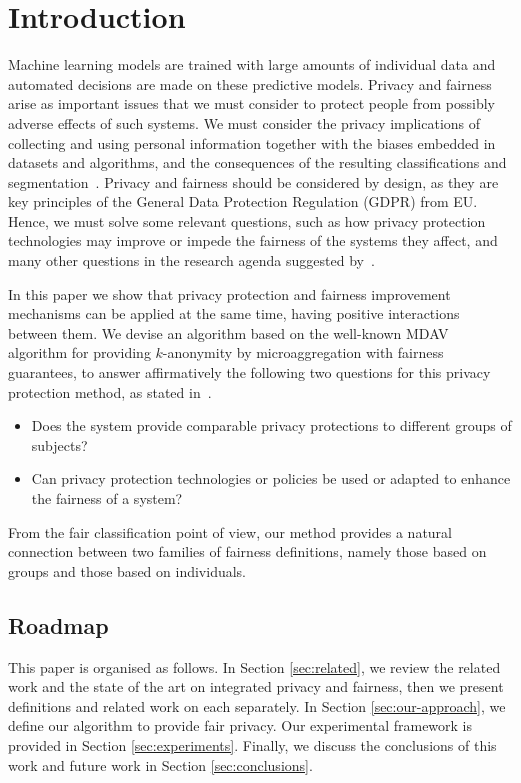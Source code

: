 \documentclass[runningheads]{llncs}
\begin{document}

\section{Introduction}
\label{sec:intro}
Machine learning models are trained with large amounts of individual data and automated decisions are made on these predictive models. Privacy and fairness arise as important issues that we must consider to protect people from possibly adverse effects of such systems. We must consider the privacy implications of collecting and using personal information together with the biases embedded in datasets and algorithms, and the consequences of the resulting classifications and segmentation~\cite{Dwork-l:2013}.
Privacy and fairness should be considered by design, as they are key principles of the General Data Protection Regulation (GDPR) from EU. Hence, we must solve some relevant questions, such as how privacy protection technologies may improve or impede the fairness of the systems they affect, and many other questions in the research agenda suggested by~\cite{Ekstrand:2018}. 

In this paper we show that privacy protection and fairness improvement mechanisms can be applied at the same time, having positive interactions between them. 
We devise an algorithm based on the well-known MDAV~\cite{Domingo:2005} algorithm for providing $k$-anonymity by microaggregation with fairness guarantees, to answer affirmatively the following two questions for this privacy protection method, as stated in~\cite{Ekstrand:2018}.
\begin{itemize}
\item Does the system provide comparable privacy protections to different groups of subjects?
\item Can privacy protection technologies or policies be used or adapted to enhance the fairness of a system? 
\end{itemize} 

From the fair classification point of view, our method provides a natural connection between two families of fairness definitions, namely those based on groups and those based on individuals. 

\subsection{Roadmap}

This paper is organised as follows. In Section \ref{sec:related}, we review the related work and the state of the art on integrated privacy and fairness, then we present definitions and related work on each separately.
In Section \ref{sec:our-approach}, we define our algorithm to provide fair privacy. 
Our experimental framework is provided in Section \ref{sec:experiments}.
Finally, we discuss the conclusions of this work and future work in Section \ref{sec:conclusions}.
\end{document}

